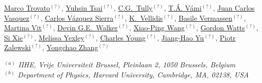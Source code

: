 \noindent\href{mailto:marco.trovato@cern.ch}{Marco Trovato}$^{(?)}$,
\noindent\href{mailto:yhtsai@umd.edu}{Yuhsin Tsai}$^{(?)}$,
\noindent\href{mailto:cgtully@princeton.edu}{C.G.~Tully}$^{(?)}$,
\noindent\href{mailto:tamas.almos.vami@cern.ch}{T.\'A. V\'ami}$^{(?)}$,
\noindent\href{mailto:juan.vasquezcar@usm.cl}{Juan Carlos Vasquez}$^{(?)}$,
\noindent\href{mailto:carlos.vazquez@cern.ch}{Carlos V\'azquez Sierra}$^{(?)}$,
\noindent\href{mailto:konstantinos.vellidis@cern.ch}{K.~Vellidis}$^{(?)}$,
\noindent\href{mailto:basile.vermassen@cern.ch}{Basile Vermassen}$^{(?)}$,
\noindent\href{mailto:martina.vit@cern.ch}{Martina Vit}$^{(?)}$,
\noindent\href{mailto:devin.g.walker@dartmouth.edu}{Devin G.E.~Walker}$^{(?)}$,
\noindent\href{mailto:xia.wang@anl.gov}{Xiao-Ping Wang}$^{(?)}$,
\noindent\href{mailto:gwatts@uw.edu}{Gordon Watts}$^{(?)}$,
\noindent\href{mailto:sixie@caltech.edu}{Si Xie}$^{(?)}$,
\noindent\href{mailto:m.yexley@cern.ch}{Melissa Yexley}$^{(?)}$,
\noindent\href{mailto:young@slac.stanford.edu}{Charles Young}$^{(?)}$,
\noindent\href{mailto:jhyu@itp.ac.cn}{Jiang-Hao Yu}$^{(?)}$,
\noindent\href{mailto:piotr.zalewski@ncbj.gov.pl}{Piotr Zalewski}$^{(?)}$,
\noindent\href{mailto:yongchao2228@gmail.com}{Yongchao Zhang}$^{(?)}$

\vspace{0.25cm}

{\footnotesize
\begin{center}
$^{(a)}$ \emph{IIHE, Vrije Universiteit Brussel, Pleinlaan 2, 1050 Brussels, Belgium}\\
$^{(b)}$ \emph{Department of Physics, Harvard University, Cambridge, MA, 02138, USA}
\end{center}}